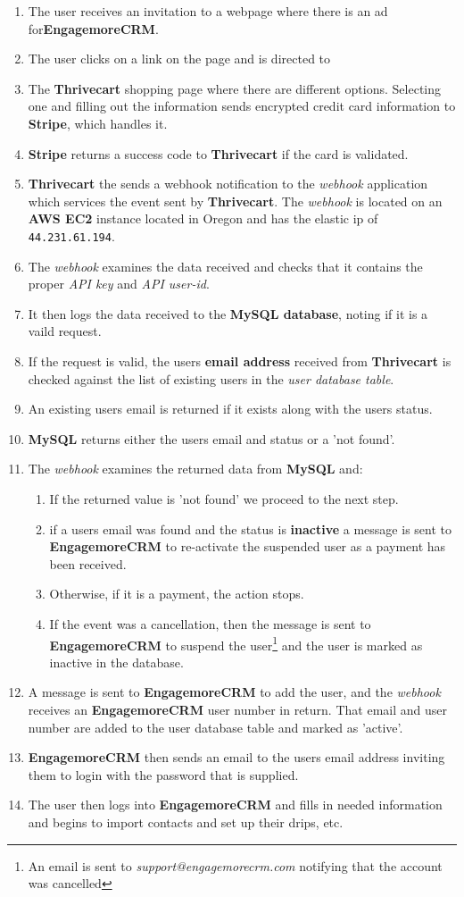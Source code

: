 \documentclass[final,letterpaper,12pt]{article}
\begin{document}
\begin{enumerate}
\item The user receives an invitation to a webpage where there is an ad for{\bf  EngagemoreCRM}.
\item The user clicks on a link on the page and is directed to
\item The {\bf Thrivecart} shopping page where there are different options. Selecting one and filling out the information sends encrypted credit card information to {\bf Stripe}, which handles it.
\item {\bf Stripe} returns a success code to {\bf Thrivecart} if the card is validated.
\item {\bf Thrivecart} the sends a webhook notification to the {\it webhook} application which services the event sent by {\bf Thrivecart}.  The {\it webhook} is located on an {\bf AWS EC2} instance located in Oregon and has the elastic ip of {\tt 44.231.61.194}.
\item The {\it webhook} examines the data received and checks that it contains the proper {\it API key} and {\it API user-id}.  
\item It then logs the data received to the {\bf MySQL database}, noting if it is a vaild request.
\item If the request is valid, the users {\bf email address} received from {\bf Thrivecart} is checked against the list of existing users in the {\it user database table}.
\item An existing users email is returned if it exists along with the users status.
\item {\bf MySQL} returns either the users email and status or a 'not found'.
\item The {\it webhook} examines the returned data from {\bf MySQL} and:
\begin{enumerate}
\item If the returned value is 'not found' we proceed to the next step.
\item if a users email was found and the status is {\bf inactive} a message is sent to {\bf EngagemoreCRM} to re-activate the suspended user as a payment has been received.  
\item Otherwise, if it is a payment, the action stops.  
\item If the event was a cancellation, then the message is sent to {\bf EngagemoreCRM} to suspend the user\footnote{An email is sent to {\it support@engagemorecrm.com} notifying that the account was cancelled} and the user is marked as inactive in the database.
\end{enumerate}
\item A message is sent to {\bf EngagemoreCRM} to add the user, and the {\it webhook} receives an {\bf EngagemoreCRM} user number in return.  That email and user number are added to the user database table and marked as 'active'.
\item {\bf EngagemoreCRM} then sends an email to the users email address inviting them to login with the password that is supplied.
\item The user then logs into {\bf EngagemoreCRM} and fills in needed information and begins to import contacts and set up their drips, etc.
\end{enumerate}
\end{document}
